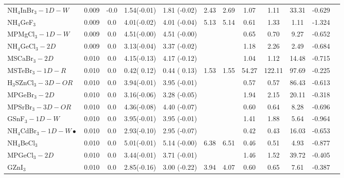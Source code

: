 \begin{table*}
\begin{tabular*}{0.98\textwidth}{@{\extracolsep{\fill}}l c c c c c c c c c c c}
 NH$_4$InBr$_3-1D-W$&      0.009&       -0.0&       1.54(-0.01)&            1.81  (-0.02)&       2.43&            2.69&            1.07&            1.11&           33.31&     -0.629\\
       NH$_4$GeF$_3$&      0.009&        0.0&       4.01(-0.02)&            4.01  (-0.04)&       5.13&            5.14&            0.61&            1.33&            1.11&     -1.324\\
     MPMgCl$_3-1D-W$&      0.009&        0.0&       4.51(-0.00)&            4.51  (-0.00)&           &                &            0.65&            0.70&            9.27&     -0.652\\
   NH$_4$GeCl$_3-2D$&      0.009&        0.0&       3.13(-0.04)&            3.37  (-0.02)&           &                &            1.18&            2.26&            2.49&     -0.684\\
       MSCaBr$_3-2D$&      0.010&        0.0&       4.15(-0.13)&            4.17  (-0.12)&           &                &            1.04&            1.12&           14.48&     -0.715\\
     MSTeBr$_3-1D-R$&      0.010&        0.0&       0.42( 0.12)&            0.44  ( 0.13)&       1.53&            1.55&           54.27&          122.11&           97.69&     -0.225\\
H$_3$SZnCl$_3-3D-OR$&      0.010&        0.0&       3.94(-0.01)&            3.95  (-0.01)&           &                &            0.57&            0.57&           86.43&     -0.613\\
       MPGeBr$_3-2D$&      0.010&        0.0&       3.16(-0.06)&            3.28  (-0.05)&           &                &            1.94&            2.15&           20.11&     -0.318\\
    MPSrBr$_3-3D-OR$&      0.010&        0.0&       4.36(-0.08)&            4.40  (-0.07)&           &                &            0.60&            0.64&            8.28&     -0.696\\
       GSnF$_3-1D-W$&      0.010&        0.0&       3.95(-0.01)&            3.95  (-0.01)&           &                &            1.41&            1.88&            5.64&     -0.964\\
NH$_4$CdBr$_3-1D-W\bullet$&      0.010&        0.0&       2.93(-0.10)&            2.95  (-0.07)&           &                &            0.42&            0.43&           16.03&     -0.653\\
      NH$_4$BeCl$_3$&      0.010&        0.0&       5.01(-0.01)&            5.14  (-0.00)&       6.38&            6.51&            0.46&            0.51&            4.93&     -0.877\\
       MPGeCl$_3-2D$&      0.010&        0.0&       3.44(-0.01)&            3.71  (-0.01)&           &                &            1.46&            1.52&           39.72&     -0.405\\
            GZnI$_3$&      0.010&        0.0&       2.85(-0.16)&            3.00  (-0.22)&       3.94&            4.07&            0.60&            0.65&            7.61&     -0.387\\
   \hline 
    \end{tabular*}
 \end{table*}
%
